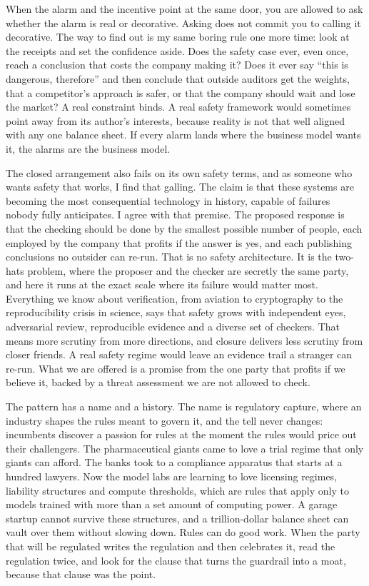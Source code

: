 \documentclass[11pt]{article}
\begin{document}
When the alarm and the incentive point at the same door, you are allowed to ask whether the alarm is real or decorative. Asking does not commit you to calling it decorative. The way to find out is my same boring rule one more time: look at the receipts and set the confidence aside. Does the safety case ever, even once, reach a conclusion that costs the company making it? Does it ever say ``this is dangerous, therefore'' and then conclude that outside auditors get the weights, that a competitor's approach is safer, or that the company should wait and lose the market? A real constraint binds. A real safety framework would sometimes point away from its author's interests, because reality is not that well aligned with any one balance sheet. If every alarm lands where the business model wants it, the alarms are the business model.

The closed arrangement also fails on its own safety terms, and as someone who wants safety that works, I find that galling. The claim is that these systems are becoming the most consequential technology in history, capable of failures nobody fully anticipates. I agree with that premise. The proposed response is that the checking should be done by the smallest possible number of people, each employed by the company that profits if the answer is yes, and each publishing conclusions no outsider can re-run. That is no safety architecture. It is the two-hats problem, where the proposer and the checker are secretly the same party, and here it runs at the exact scale where its failure would matter most. Everything we know about verification, from aviation to cryptography to the reproducibility crisis in science, says that safety grows with independent eyes, adversarial review, reproducible evidence and a diverse set of checkers. That means more scrutiny from more directions, and closure delivers less scrutiny from closer friends. A real safety regime would leave an evidence trail a stranger can re-run. What we are offered is a promise from the one party that profits if we believe it, backed by a threat assessment we are not allowed to check.

The pattern has a name and a history. The name is regulatory capture, where an industry shapes the rules meant to govern it, and the tell never changes: incumbents discover a passion for rules at the moment the rules would price out their challengers. The pharmaceutical giants came to love a trial regime that only giants can afford. The banks took to a compliance apparatus that starts at a hundred lawyers. Now the model labs are learning to love licensing regimes, liability structures and compute thresholds, which are rules that apply only to models trained with more than a set amount of computing power. A garage startup cannot survive these structures, and a trillion-dollar balance sheet can vault over them without slowing down. Rules can do good work. When the party that will be regulated writes the regulation and then celebrates it, read the regulation twice, and look for the clause that turns the guardrail into a moat, because that clause was the point.
\end{document}
